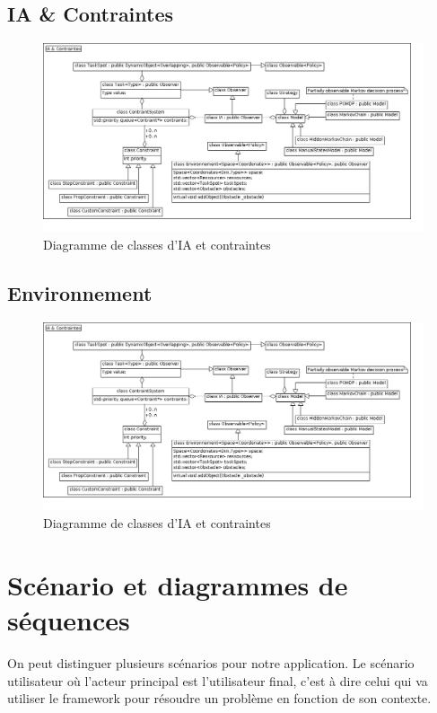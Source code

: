 \subsection{IA \& Contraintes}
\begin{figure}[!h]\centering
   \includegraphics[scale=0.5]{images/c_ia_contraintes.png}
   \caption{\label{c_ia_contraintes} Diagramme de classes d'IA et contraintes}
\end{figure}

\subsection{Environnement}
\begin{figure}[!h]\centering
   \includegraphics[scale=0.5]{images/c_ia_contraintes.png}
   \caption{\label{c_ia_contraintes} Diagramme de classes d'IA et contraintes}
\end{figure}
%
\section{Scénario et diagrammes de séquences}

On peut distinguer plusieurs scénarios pour notre application. Le scénario utilisateur où l'acteur principal est l'utilisateur final, c'est à dire celui qui va utiliser le framework pour résoudre un problème en fonction de son contexte.\\

